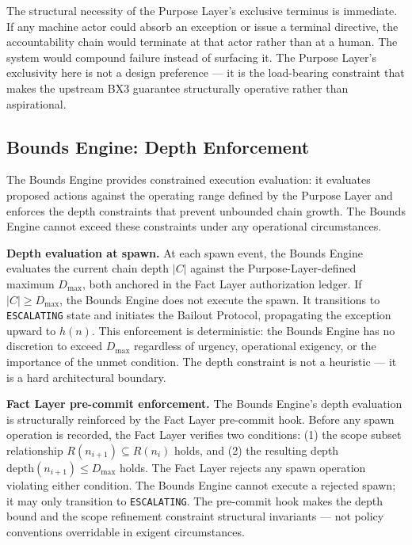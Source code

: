 The structural necessity of the Purpose Layer's exclusive terminus is immediate. If any machine actor could absorb an exception or issue a terminal directive, the accountability chain would terminate at that actor rather than at a human. The system would compound failure instead of surfacing it. The Purpose Layer's exclusivity here is not a design preference --- it is the load-bearing constraint that makes the upstream BX3 guarantee structurally operative rather than aspirational.

\subsection{Bounds Engine: Depth Enforcement}
\label{sec:rs-bounds-depth}

The Bounds Engine provides constrained execution evaluation: it evaluates proposed actions against the operating range defined by the Purpose Layer and enforces the depth constraints that prevent unbounded chain growth. The Bounds Engine cannot exceed these constraints under any operational circumstances.

\medskip
\noindent\textbf{Depth evaluation at spawn.} At each spawn event, the Bounds Engine evaluates the current chain depth $|C|$ against the Purpose-Layer-defined maximum $D_{\mathrm{max}}$, both anchored in the Fact Layer authorization ledger. If $|C| \geq D_{\mathrm{max}}$, the Bounds Engine does not execute the spawn. It transitions to \texttt{ESCALATING} state and initiates the Bailout Protocol, propagating the exception upward to $h(n)$. This enforcement is deterministic: the Bounds Engine has no discretion to exceed $D_{\mathrm{max}}$ regardless of urgency, operational exigency, or the importance of the unmet condition. The depth constraint is not a heuristic --- it is a hard architectural boundary.

\medskip
\noindent\textbf{Fact Layer pre-commit enforcement.} The Bounds Engine's depth evaluation is structurally reinforced by the Fact Layer pre-commit hook. Before any spawn operation is recorded, the Fact Layer verifies two conditions: (1) the scope subset relationship $R(n_{i+1}) \subseteq R(n_i)$ holds, and (2) the resulting depth $\mathrm{depth}(n_{i+1}) \leq D_{\mathrm{max}}$ holds. The Fact Layer rejects any spawn operation violating either condition. The Bounds Engine cannot execute a rejected spawn; it may only transition to \texttt{ESCALATING}. The pre-commit hook makes the depth bound and the scope refinement constraint structural invariants --- not policy conventions overridable in exigent circumstances.

